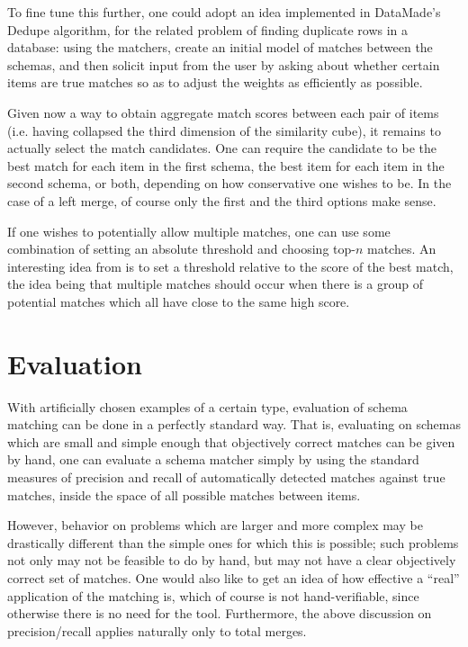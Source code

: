 \documentclass{datamade}
\theoremstyle{definition}
\theoremstyle{remark}
\begin{document}
To fine tune this further, one could adopt an idea implemented in DataMade's Dedupe algorithm, for the related problem of finding duplicate rows in a database: using the matchers, create an initial model of matches between the schemas, and then solicit input from the user by asking about whether certain items are true matches so as to adjust the weights as efficiently as possible.

Given now a way to obtain aggregate match scores between each pair of items (i.e. having collapsed the third dimension of the similarity cube), it remains to actually select the match candidates. One can require the candidate to be the best match for each item in the first schema, the best item for each item in the second schema, or both, depending on how conservative one wishes to be. In the case of a left merge, of course only the first and the third options make sense.

If one wishes to potentially allow multiple matches, one can use some combination of setting an absolute threshold and choosing top-$n$ matches. An interesting idea from \cite{coma} is to set a threshold relative to the score of the best match, the idea being that multiple matches should occur when there is a group of potential matches which all have close to the same high score.

\section{Evaluation}

With artificially chosen examples of a certain type, evaluation of schema matching can be done in a perfectly standard way. That is, evaluating on schemas which are small and simple enough that objectively correct matches can be given by hand, one can evaluate a schema matcher simply by using the standard measures of precision and recall of automatically detected matches against true matches, inside the space of all possible matches between items.

However, behavior on problems which are larger and more complex may be drastically different than the simple ones for which this is possible; such problems not only may not be feasible to do by hand, but may not have a clear objectively correct set of matches. One would also like to get an idea of how effective a ``real'' application of the matching is, which of course is not hand-verifiable, since otherwise there is no need for the tool. Furthermore, the above discussion on precision/recall applies naturally only to total merges.
\end{document}
